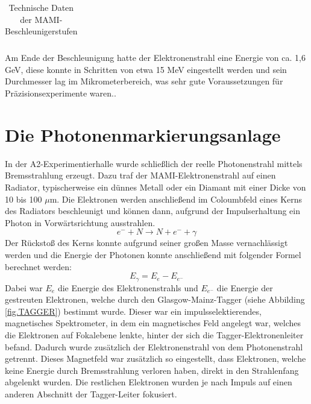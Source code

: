 \documentclass[a4paper,11pt,oneside,final,german,openbib,pdftex]{scrbook}
\begin{document}
{\begin{table}[h!]
\begin{tabular}{|l|c|c|c|c|}
	
		\end{tabular}

		\caption{Technische Daten der MAMI-Beschleunigerstufen \cite{Un08}}
		\label{tab.MAMIstufen}

\end{table}

 Am Ende der Beschleunigung hatte der Elektronenstrahl eine Energie von ca. 1,6 GeV, diese konnte in Schritten von etwa 15 MeV eingestellt werden und sein Durchmesser lag im Mikrometerbereich, was sehr gute Voraussetzungen f\"ur Pr\"azisionsexperimente waren.\cite{KPh07}. 
 
 
 \section{Die Photonenmarkierungsanlage}
 
 In der A2-Experimentierhalle wurde schlie{\ss}lich der reelle Photonenstrahl mittels Bremsstrahlung erzeugt. Dazu traf der MAMI-Elektronenstrahl auf einen Radiator, typischerweise ein d\"unnes Metall oder ein Diamant mit einer Dicke von 10 bis 100 $\mu$m. Die Elektronen werden anschlie{\ss}end im Coloumbfeld eines Kerns des Radiators beschleunigt und k\"onnen dann, aufgrund der Impulserhaltung ein Photon in Vorw\"artsrichtung ausstrahlen.
 \begin{equation}
 e^{-}+N\rightarrow N + e^{-}+\gamma
 \label{eq.Streuung}
 \end{equation}
  Der R\"ucksto{\ss} des Kerns konnte aufgrund seiner gro{\ss}en Masse vernachl\"assigt werden und die Energie der Photonen konnte anschlie{\ss}end mit folgender Formel berechnet werden:
  \begin{equation}
  E_{\gamma}= E_{e^{}}-E_{e^-}
  \label{eq.Photonenenergie}
  \end{equation}
 Dabei war $E_e$ die Energie des Elektronenstrahls und $E_{e^-}$ die Energie der gestreuten Elektronen, welche durch den Glasgow-Mainz-Tagger (siehe Abbilding \ref{fig.TAGGER}) bestimmt wurde.
 Dieser war ein impulsselektierendes, magnetisches Spektrometer, in dem ein magnetisches Feld angelegt war, welches die Elektronen auf Fokalebene lenkte, hinter der sich die Tagger-Elektronenleiter befand. Dadurch wurde zus\"atzlich der Elektronenstrahl von dem Photonenstrahl getrennt. Dieses Magnetfeld war zus\"atzlich so eingestellt, dass Elektronen, welche keine Energie durch Bremsstrahlung verloren haben, direkt in den Strahlenfang abgelenkt wurden. Die restlichen Elektronen wurden je nach Impuls auf einen anderen Abschnitt der Tagger-Leiter fokusiert.
 
}
\end{document}
